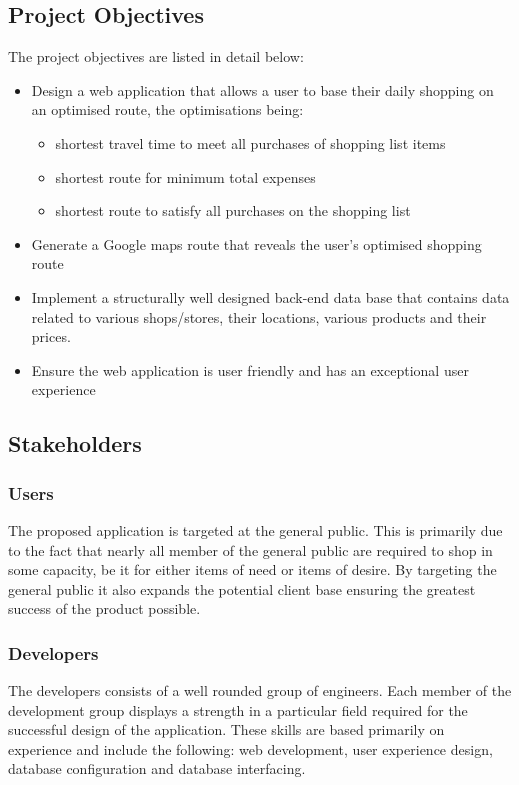 \documentclass[10pt,twocolumn]{witseiepaper}
\begin{document}
	\subsection{Project Objectives}

		The project objectives are listed in detail below:

		\begin{itemize}
			\item Design a web application that allows a user to base their daily shopping on an optimised route, the optimisations being:
			\begin{itemize}
				\item shortest travel time to meet all purchases of shopping list items 
				\item shortest route for minimum total expenses
				\item shortest route to satisfy all purchases on the shopping list 
			\end{itemize}
			\item Generate a Google maps route that reveals the user's optimised shopping route
			\item Implement a structurally well designed back-end data base that contains data related to various shops/stores, their locations, various products and their prices.
			\item Ensure the web application is user friendly and has an exceptional user experience
		\end{itemize}

	\subsection{Stakeholders}
		
		\subsubsection{Users} The proposed application is targeted at the general public. This is primarily due to the fact that nearly all member of the general public are required to shop in some capacity, be it for either items of need or items of desire. By targeting the general public it also expands the potential client base ensuring the greatest success of the product possible.\\
		
		\subsubsection{Developers} The developers consists of a well rounded group of engineers. Each member of the development group displays a strength in a particular field required for the successful design of the application. These skills are based primarily on experience and include the following: web development, user experience design, database configuration and database interfacing.\\ 
		
\end{document}
